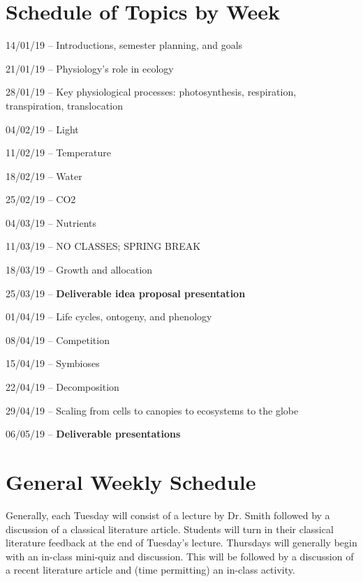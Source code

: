\documentclass[12pt, notitlepage]{article}   	%
\begin{document}
\section*{Schedule of Topics by Week}
14/01/19 – Introductions, semester planning, and goals \par
21/01/19 – Physiology’s role in ecology \par
28/01/19 – Key physiological processes: 
photosynthesis, respiration, transpiration, translocation \par
04/02/19 – Light \par
11/02/19 – Temperature \par
18/02/19 – Water \par
25/02/19 – CO2 \par
04/03/19 – Nutrients \par
11/03/19 – NO CLASSES; SPRING BREAK \par
18/03/19 – Growth and allocation \par
25/03/19 – \textbf{Deliverable idea proposal presentation} \par
01/04/19 – Life cycles, ontogeny, and phenology \par
08/04/19 – Competition \par
15/04/19 – Symbioses \par
22/04/19 – Decomposition \par
29/04/19 – Scaling from cells to canopies to ecosystems to the globe \par
06/05/19 – \textbf{Deliverable presentations} \par

\section*{General Weekly Schedule}
Generally, each Tuesday will consist of a lecture by Dr. Smith followed by a discussion
of a classical literature article. Students will turn in their classical literature
feedback at the end of Tuesday's lecture. Thursdays will generally begin with an in-class
mini-quiz and discussion. 
This will be followed by a discussion of a recent literature article and
(time permitting) an in-class activity.
\end{document}
